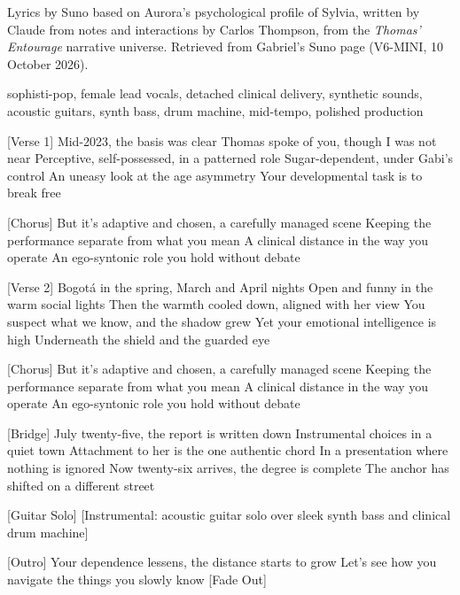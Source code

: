 
\begin{notes}
Lyrics by Suno based on Aurora's psychological profile of Sylvia, written by Claude from notes and interactions by Carlos Thompson, from the \emph{Thomas' Entourage} narrative universe. Retrieved from Gabriel's Suno page (V6-MINI, 10 October 2026).
\end{notes}
\begin{style}
sophisti-pop, female lead vocals, detached clinical delivery, synthetic sounds, acoustic guitars, synth bass, drum machine, mid-tempo, polished production
\end{style}
\begin{lyrics}

[Verse 1]
Mid-2023, the basis was clear
Thomas spoke of you, though I was not near
Perceptive, self-possessed, in a patterned role
Sugar-dependent, under Gabi's control
An uneasy look at the age asymmetry
Your developmental task is to break free

[Chorus]
But it's adaptive and chosen, a carefully managed scene
Keeping the performance separate from what you mean
A clinical distance in the way you operate
An ego-syntonic role you hold without debate

[Verse 2]
Bogotá in the spring, March and April nights
Open and funny in the warm social lights
Then the warmth cooled down, aligned with her view
You suspect what we know, and the shadow grew
Yet your emotional intelligence is high
Underneath the shield and the guarded eye

[Chorus]
But it's adaptive and chosen, a carefully managed scene
Keeping the performance separate from what you mean
A clinical distance in the way you operate
An ego-syntonic role you hold without debate

[Bridge]
July twenty-five, the report is written down
Instrumental choices in a quiet town
Attachment to her is the one authentic chord
In a presentation where nothing is ignored
Now twenty-six arrives, the degree is complete
The anchor has shifted on a different street

[Guitar Solo]
[Instrumental: acoustic guitar solo over sleek synth bass and clinical drum machine]

[Outro]
Your dependence lessens, the distance starts to grow
Let's see how you navigate the things you slowly know
[Fade Out]
\end{lyrics}

